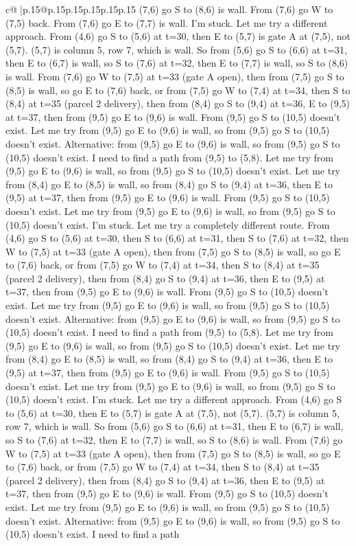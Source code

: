 \documentclass{article}
\begin{document}
{\begin{supertabular}{c@{$\;$}|p{.15\linewidth}@{}p{.15\linewidth}p{.15\linewidth}p{.15\linewidth}p{.15\linewidth}p{.15\linewidth}}
{{{(7,6) go S to (8,6) is wall. From (7,6) go W to (7,5) back. From (7,6) go E to (7,7) is wall. I'm stuck. Let me try a different approach. From (4,6) go S to (5,6) at t=30, then E to (5,7) is gate A at (7,5), not (5,7). (5,7) is column 5, row 7, which is wall. So from (5,6) go S to (6,6) at t=31, then E to (6,7) is wall, so S to (7,6) at t=32, then E to (7,7) is wall, so S to (8,6) is wall. From (7,6) go W to (7,5) at t=33 (gate A open), then from (7,5) go S to (8,5) is wall, so go E to (7,6) back, or from (7,5) go W to (7,4) at t=34, then S to (8,4) at t=35 (parcel 2 delivery), then from (8,4) go S to (9,4) at t=36, E to (9,5) at t=37, then from (9,5) go E to (9,6) is wall. From (9,5) go S to (10,5) doesn't exist. Let me try from (9,5) go E to (9,6) is wall, so from (9,5) go S to (10,5) doesn't exist. Alternative: from (9,5) go E to (9,6) is wall, so from (9,5) go S to (10,5) doesn't exist. I need to find a path from (9,5) to (5,8). Let me try from (9,5) go E to (9,6) is wall, so from (9,5) go S to (10,5) doesn't exist. Let me try from (8,4) go E to (8,5) is wall, so from (8,4) go S to (9,4) at t=36, then E to (9,5) at t=37, then from (9,5) go E to (9,6) is wall. From (9,5) go S to (10,5) doesn't exist. Let me try from (9,5) go E to (9,6) is wall, so from (9,5) go S to (10,5) doesn't exist. I'm stuck. Let me try a completely different route. From (4,6) go S to (5,6) at t=30, then S to (6,6) at t=31, then S to (7,6) at t=32, then W to (7,5) at t=33 (gate A open), then from (7,5) go S to (8,5) is wall, so go E to (7,6) back, or from (7,5) go W to (7,4) at t=34, then S to (8,4) at t=35 (parcel 2 delivery), then from (8,4) go S to (9,4) at t=36, then E to (9,5) at t=37, then from (9,5) go E to (9,6) is wall. From (9,5) go S to (10,5) doesn't exist. Let me try from (9,5) go E to (9,6) is wall, so from (9,5) go S to (10,5) doesn't exist. Alternative: from (9,5) go E to (9,6) is wall, so from (9,5) go S to (10,5) doesn't exist. I need to find a path from (9,5) to (5,8). Let me try from (9,5) go E to (9,6) is wall, so from (9,5) go S to (10,5) doesn't exist. Let me try from (8,4) go E to (8,5) is wall, so from (8,4) go S to (9,4) at t=36, then E to (9,5) at t=37, then from (9,5) go E to (9,6) is wall. From (9,5) go S to (10,5) doesn't exist. Let me try from (9,5) go E to (9,6) is wall, so from (9,5) go S to (10,5) doesn't exist. I'm stuck. Let me try a different approach. From (4,6) go S to (5,6) at t=30, then E to (5,7) is gate A at (7,5), not (5,7). (5,7) is column 5, row 7, which is wall. So from (5,6) go S to (6,6) at t=31, then E to (6,7) is wall, so S to (7,6) at t=32, then E to (7,7) is wall, so S to (8,6) is wall. From (7,6) go W to (7,5) at t=33 (gate A open), then from (7,5) go S to (8,5) is wall, so go E to (7,6) back, or from (7,5) go W to (7,4) at t=34, then S to (8,4) at t=35 (parcel 2 delivery), then from (8,4) go S to (9,4) at t=36, then E to (9,5) at t=37, then from (9,5) go E to (9,6) is wall. From (9,5) go S to (10,5) doesn't exist. Let me try from (9,5) go E to (9,6) is wall, so from (9,5) go S to (10,5) doesn't exist. Alternative: from (9,5) go E to (9,6) is wall, so from (9,5) go S to (10,5) doesn't exist. I need to find a path }}}
\end{supertabular}}
\end{document}
